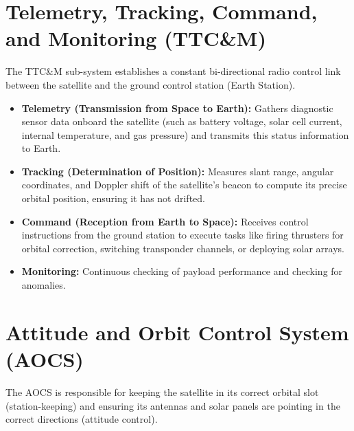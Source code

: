 \documentclass[12pt,a4paper]{article}
\begin{document}
\section{Telemetry, Tracking, Command, and Monitoring (TTC\&M)}

The TTC\&M sub-system establishes a constant bi-directional radio control link between the satellite and the ground control station (Earth Station).

\begin{itemize}[leftmargin=*, itemsep=3.5pt]
  \item \textbf{Telemetry (Transmission from Space to Earth):} Gathers diagnostic sensor data onboard the satellite (such as battery voltage, solar cell current, internal temperature, and gas pressure) and transmits this status information to Earth.
  \item \textbf{Tracking (Determination of Position):} Measures slant range, angular coordinates, and Doppler shift of the satellite's beacon to compute its precise orbital position, ensuring it has not drifted.
  \item \textbf{Command (Reception from Earth to Space):} Receives control instructions from the ground station to execute tasks like firing thrusters for orbital correction, switching transponder channels, or deploying solar arrays.
  \item \textbf{Monitoring:} Continuous checking of payload performance and checking for anomalies.
\end{itemize}

\section{Attitude and Orbit Control System (AOCS)}

The AOCS is responsible for keeping the satellite in its correct orbital slot (station-keeping) and ensuring its antennas and solar panels are pointing in the correct directions (attitude control).
\end{document}
